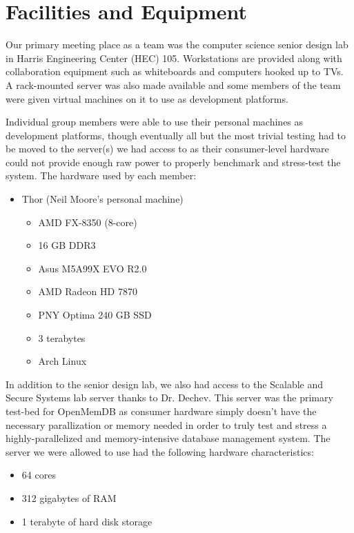 \documentclass[letterpaper]{article}
\begin{document}
\section{Facilities and Equipment}
Our primary meeting place as a team was the computer science senior design lab in Harris Engineering
Center (HEC) 105. Workstations are provided along with collaboration equipment such as 
whiteboards and computers hooked up to TVs. A rack-mounted server was also made available and 
some members of the team were given virtual machines on it to use as development
platforms.
\par\vspace{\baselineskip}
Individual group members were able to use their personal machines as development platforms, though 
eventually all but the most trivial testing had to be moved to the server(s) we had access to
as their consumer-level hardware could not provide enough raw power to properly benchmark and
stress-test the system. The hardware used by each member:
\begin{itemize}
 \item Thor (Neil Moore's personal machine)
 \begin{itemize}
  \item{ AMD FX-8350 (8-core)}
  \item{ 16 GB DDR3}
  \item{ Asus M5A99X EVO R2.0}
  \item{ AMD Radeon HD 7870}
  \item{ PNY Optima 240 GB SSD}
  \item{ 3 terabytes}
  \item{ Arch Linux}
 \end{itemize}
\end{itemize}
\par\vspace{\baselineskip}
In addition to the senior design lab, we also had access to the Scalable and Secure Systems lab server
thanks to Dr. Dechev. This server was the primary test-bed for OpenMemDB as consumer hardware simply
doesn't have the necessary parallization or memory needed in order to truly test and stress a
highly-parallelized and memory-intensive database management system. The server we were allowed to 
use had the following hardware characteristics:
\begin{itemize}
 \item 64 cores
 \item 312 gigabytes of RAM
 \item 1 terabyte of hard disk storage
\end{itemize}
\end{document}
